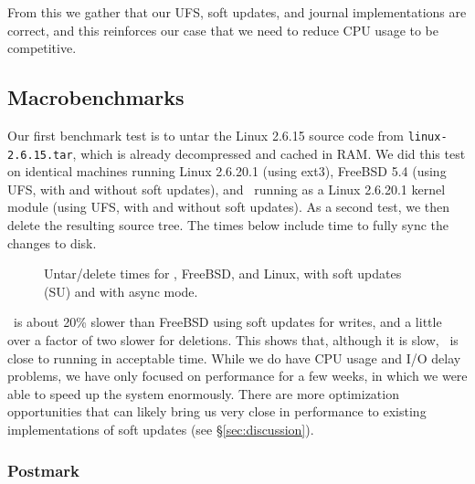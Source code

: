 From this we gather that our UFS, soft updates, and journal
implementations are correct, and this reinforces our case that we need
to reduce CPU usage to be competitive.

\subsection {Macrobenchmarks}
Our first benchmark test is to untar the Linux 2.6.15 source code from
\texttt{linux-2.6.15.tar}, which is already decompressed and cached in RAM. We
did this test on identical machines running Linux 2.6.20.1 (using ext3), FreeBSD
5.4 (using UFS, with and without soft updates), and \Kudos\ running as a Linux
2.6.20.1 kernel module (using UFS, with and without soft updates). As a second
test, we then delete the resulting source tree. The times below include time to
fully sync the changes to disk.

\begin{figure}[htb]
\caption{\label{fig:macro} Untar/delete times for \Kudos, FreeBSD, and Linux,
with soft updates (SU) and with async mode.}
\end{figure}

\Kudos\ is about 20\% slower than FreeBSD using soft updates for
writes, and a little over a factor of two slower for deletions. This
shows that, although it is slow, \Kudos\ is close to running in
acceptable time. While we do have CPU usage and I/O delay problems, we
have only focused on performance for a few weeks, in which we were
able to speed up the system enormously.  There are more optimization
opportunities that can likely bring us very close in performance to
existing implementations of soft updates (see \S\ref{sec:discussion}).

\subsubsection {Postmark}

